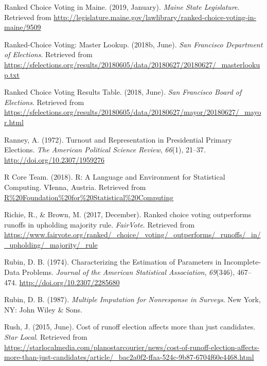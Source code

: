 \documentclass[12pt,twoside]{reedthesis}
\begin{document}
\leavevmode\hypertarget{ref-noauthor_ranked_2019}{}%
Ranked Choice Voting in Maine. (2019, January). \emph{Maine State Legislature}. Retrieved from \url{http://legislature.maine.gov/lawlibrary/ranked-choice-voting-in-maine/9509}

\leavevmode\hypertarget{ref-noauthor_ranked-choice_2018}{}%
Ranked-Choice Voting: Master Lookup. (2018b, June). \emph{San Francisco Department of Elections}. Retrieved from \url{https://sfelections.org/results/20180605/data/20180627/20180627/_masterlookup.txt}

\leavevmode\hypertarget{ref-noauthor_ranked_2018}{}%
Ranked Choice Voting Results Table. (2018, June). \emph{San Francisco Board of Elections}. Retrieved from \url{https://sfelections.org/results/20180605/data/20180627/mayor/20180627/_mayor.html}

\leavevmode\hypertarget{ref-ranney_turnout_1972}{}%
Ranney, A. (1972). Turnout and Representation in Presidential Primary Elections. \emph{The American Political Science Review}, \emph{66}(1), 21--37. \url{http://doi.org/10.2307/1959276}

\leavevmode\hypertarget{ref-r_core_team_r_2018}{}%
R Core Team. (2018). R: A Language and Environment for Statistical Computing. VIenna, Austria. Retrieved from \url{R\%20Foundation\%20for\%20Statistical\%20Computing}

\leavevmode\hypertarget{ref-richie_ranked_2017}{}%
Richie, R., \& Brown, M. (2017, December). Ranked choice voting outperforms runoffs in upholding majority rule. \emph{FairVote}. Retrieved from \url{https://www.fairvote.org/ranked/_choice/_voting/_outperforms/_runoffs/_in/_upholding/_majority/_rule}

\leavevmode\hypertarget{ref-rubin_characterizing_1974}{}%
Rubin, D. B. (1974). Characterizing the Estimation of Parameters in Incomplete-Data Problems. \emph{Journal of the American Statistical Association}, \emph{69}(346), 467--474. \url{http://doi.org/10.2307/2285680}

\leavevmode\hypertarget{ref-rubin_multiple_1987}{}%
Rubin, D. B. (1987). \emph{Multiple Imputation for Nonresponse in Surveys}. New York, NY: John Wiley \& Sons.

\leavevmode\hypertarget{ref-rush_cost_2015}{}%
Rush, J. (2015, June). Cost of runoff election affects more than just candidates. \emph{Star Local}. Retrieved from \url{https://starlocalmedia.com/planostarcourier/news/cost-of-runoff-election-affects-more-than-just-candidates/article/_bac2a0f2-ffaa-524c-9b87-6704f60e4468.html}
\end{document}
